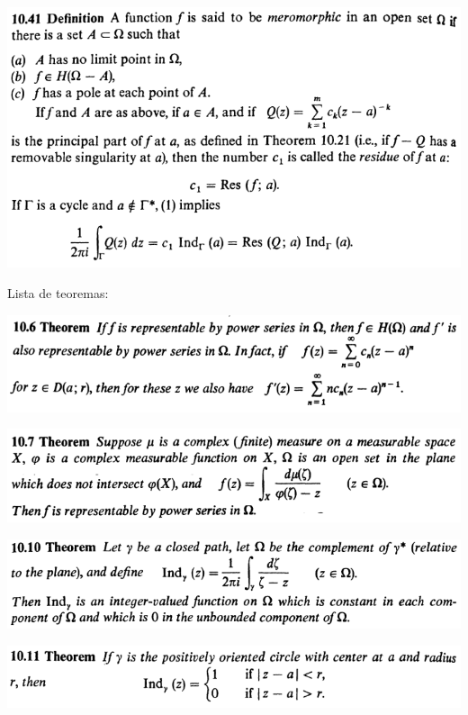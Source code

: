\documentclass[12pt]{article}
\begin{document}
		\begin{center}
		\includegraphics{d10ponto41}
		\end{center}

Lista de teoremas:

		\begin{center}
		\includegraphics{10ponto6}
		\end{center}

		\begin{center}
		\includegraphics{10ponto7}
		\end{center}

		\begin{center}
		\includegraphics{10ponto10}
		\end{center}

		\begin{center}
		\includegraphics{10ponto11}
		\end{center}
\end{document}
